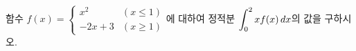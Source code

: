함수 $f(x)=\begin{cases} x^2 & (x\le 1) \\ -2x+3 & (x\ge 1) \end{cases}$에 대하여 정적분 $\displaystyle\int_{0}^{2}xf(x)\mkern3mu dx$의 값을 구하시오.
